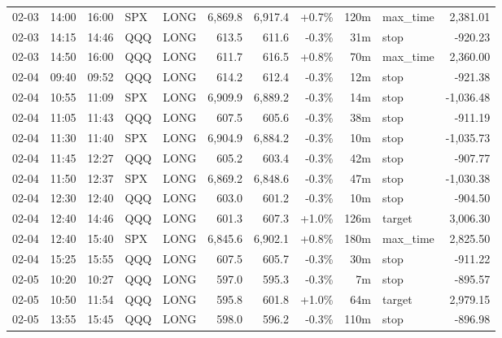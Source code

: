 \documentclass[11pt,a4paper,twoside]{article}
\begin{document}
\begin{center}
\begin{longtable}{>{\color{txtmain}}l l l l l r r r r >{\color{txtmain}}l r}
02-03 & 14:00 & 16:00 & SPX & LONG & 6,869.8 & 6,917.4 & \textcolor{wingreen}{+0.7\%} & 120m & max\_time & \textcolor{wingreen}{2,381.01} \\
02-03 & 14:15 & 14:46 & QQQ & LONG & 613.5 & 611.6 & \textcolor{lossred}{-0.3\%} & 31m & stop & \textcolor{lossred}{-920.23} \\
02-03 & 14:50 & 16:00 & QQQ & LONG & 611.7 & 616.5 & \textcolor{wingreen}{+0.8\%} & 70m & max\_time & \textcolor{wingreen}{2,360.00} \\
02-04 & 09:40 & 09:52 & QQQ & LONG & 614.2 & 612.4 & \textcolor{lossred}{-0.3\%} & 12m & stop & \textcolor{lossred}{-921.38} \\
02-04 & 10:55 & 11:09 & SPX & LONG & 6,909.9 & 6,889.2 & \textcolor{lossred}{-0.3\%} & 14m & stop & \textcolor{lossred}{-1,036.48} \\
02-04 & 11:05 & 11:43 & QQQ & LONG & 607.5 & 605.6 & \textcolor{lossred}{-0.3\%} & 38m & stop & \textcolor{lossred}{-911.19} \\
02-04 & 11:30 & 11:40 & SPX & LONG & 6,904.9 & 6,884.2 & \textcolor{lossred}{-0.3\%} & 10m & stop & \textcolor{lossred}{-1,035.73} \\
02-04 & 11:45 & 12:27 & QQQ & LONG & 605.2 & 603.4 & \textcolor{lossred}{-0.3\%} & 42m & stop & \textcolor{lossred}{-907.77} \\
02-04 & 11:50 & 12:37 & SPX & LONG & 6,869.2 & 6,848.6 & \textcolor{lossred}{-0.3\%} & 47m & stop & \textcolor{lossred}{-1,030.38} \\
02-04 & 12:30 & 12:40 & QQQ & LONG & 603.0 & 601.2 & \textcolor{lossred}{-0.3\%} & 10m & stop & \textcolor{lossred}{-904.50} \\
02-04 & 12:40 & 14:46 & QQQ & LONG & 601.3 & 607.3 & \textcolor{wingreen}{+1.0\%} & 126m & target & \textcolor{wingreen}{3,006.30} \\
02-04 & 12:40 & 15:40 & SPX & LONG & 6,845.6 & 6,902.1 & \textcolor{wingreen}{+0.8\%} & 180m & max\_time & \textcolor{wingreen}{2,825.50} \\
02-04 & 15:25 & 15:55 & QQQ & LONG & 607.5 & 605.7 & \textcolor{lossred}{-0.3\%} & 30m & stop & \textcolor{lossred}{-911.22} \\
02-05 & 10:20 & 10:27 & QQQ & LONG & 597.0 & 595.3 & \textcolor{lossred}{-0.3\%} & 7m & stop & \textcolor{lossred}{-895.57} \\
02-05 & 10:50 & 11:54 & QQQ & LONG & 595.8 & 601.8 & \textcolor{wingreen}{+1.0\%} & 64m & target & \textcolor{wingreen}{2,979.15} \\
02-05 & 13:55 & 15:45 & QQQ & LONG & 598.0 & 596.2 & \textcolor{lossred}{-0.3\%} & 110m & stop & \textcolor{lossred}{-896.98} \\

\end{longtable}
\end{center}
\end{document}
